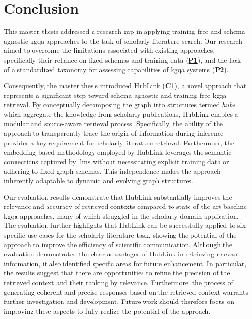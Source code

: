 
\chapter{Conclusion}
\label{ch:conclusion}

This master thesis addressed a research gap in applying training-free and schema-agnostic \gls{kgqa} approaches to the task of scholarly literature search. Our research aimed to overcome the limitations associated with existing approaches, specifically their reliance on fixed schemas and training data (\hyperref[sec:problem_statements]{\textbf{P1}}), and the lack of a standardized taxonomy for assessing capabilities of \gls{kgqa} systems (\hyperref[sec:problem_statements]{\textbf{P2}}).

Consequently, the master thesis introduced HubLink (\hyperref[enum:c1]{\textbf{C1}}), a novel approach that represents a significant step toward schema-agnostic and training-free \gls{kgqa} retrieval. By conceptually decomposing the graph into structures termed \emph{hubs}, which aggregate the knowledge from scholarly publications, HubLink enables a modular and source-aware retrieval process. Specifically, the ability of the approach to transparently trace the origin of information during inference provides a key requirement for scholarly literature retrieval. Furthermore, the embedding-based methodology employed by HubLink leverages the semantic connections captured by \glspl{llm} without necessitating explicit training data or adhering to fixed graph schemas. This independence makes the approach inherently adaptable to dynamic and evolving graph structures. 

Our evaluation results demonstrate that HubLink substantially improves the relevance and accuracy of retrieved contexts compared to state-of-the-art baseline \gls{kgqa} approaches, many of which struggled in the scholarly domain application. The evaluation further highlights that HubLink can be successfully applied to six specific use cases for the scholarly literature task, showing the potential of the approach to improve the efficiency of scientific communication. Although the evaluation demonstrated the clear advantages of HubLink in retrieving relevant information, it also identified specific areas for future enhancement. In particular, the results suggest that there are opportunities to refine the precision of the retrieved context and their ranking by relevance. Furthermore, the process of generating coherent and precise responses based on the retrieved context warrants further investigation and development. Future work should therefore focus on improving these aspects to fully realize the potential of the approach.

